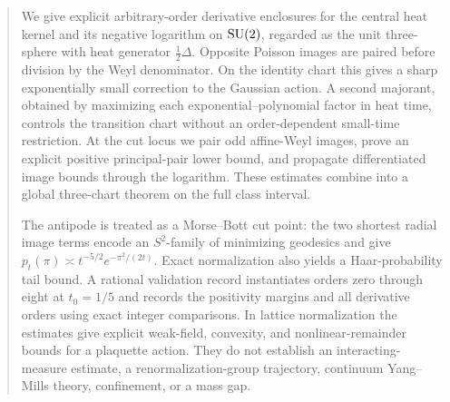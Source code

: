 \begin{abstract}
We give explicit arbitrary-order derivative enclosures for the central heat
kernel and its negative logarithm on $\SU$, regarded as the unit three-sphere
with heat generator $\tfrac12\Delta$.  Opposite Poisson images are paired
before division by the Weyl denominator.  On the identity chart this gives a
sharp exponentially small correction to the Gaussian action.  A second
majorant, obtained by maximizing each exponential--polynomial factor in heat
time, controls the transition chart without an order-dependent small-time
restriction.  At the cut locus we pair odd affine-Weyl images, prove an
explicit positive principal-pair lower bound, and propagate differentiated
image bounds through the logarithm.  These estimates combine into a global
three-chart theorem on the full class interval.

The antipode is treated as a Morse--Bott cut point: the two shortest radial
image terms encode an $S^2$-family of minimizing geodesics and give
$p_t(\pi)\asymp t^{-5/2}e^{-\pi^2/(2t)}$.  Exact normalization also yields a
Haar-probability tail bound.  A rational validation record instantiates
orders zero through eight at $t_0=1/5$ and records the positivity margins and
all derivative orders using exact integer comparisons.  In lattice
normalization the estimates give explicit weak-field, convexity, and
nonlinear-remainder bounds for a plaquette action.  They do not establish an
interacting-measure estimate, a renormalization-group trajectory, continuum
Yang--Mills theory, confinement, or a mass gap.
\end{abstract}
